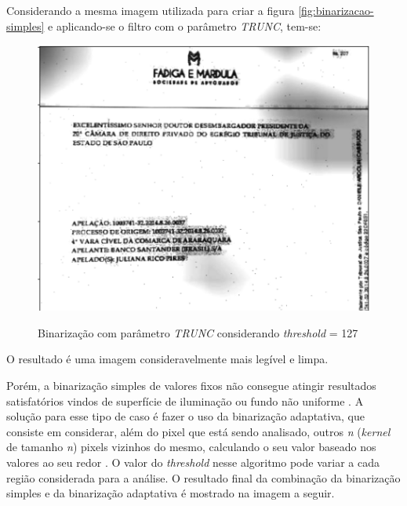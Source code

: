 Considerando a mesma imagem utilizada para criar a figura \ref{fig:binarizacao-simples} e aplicando-se o filtro com o parâmetro \textit{TRUNC}, tem-se:

\begin{figure}[H]
  \centering
  \caption{Binarização com parâmetro \textit{TRUNC} considerando \textit{threshold} = 127}
  \includegraphics[scale=.7]{figuras/binarizacao-simples-trunc.png}
  \label{fig:binarizacao-simples-trunc}
\end{figure}

O resultado é uma imagem consideravelmente mais legível e limpa.

Porém, a binarização simples de valores fixos não consegue atingir resultados satisfatórios vindos de superfície de iluminação ou fundo não uniforme \cite{adaptative-threshold-surfaces}. A solução para esse tipo de caso é fazer o uso da binarização adaptativa, que consiste em considerar, além do pixel que está sendo analisado, outros \textit{n} (\textit{kernel} de tamanho \textit{n}) pixels vizinhos do mesmo, calculando o seu valor baseado nos valores ao seu redor \cite{adaptative-threshold-surfaces}. O valor do \textit{threshold} nesse algoritmo pode variar a cada região considerada para a análise. O resultado final da combinação da binarização simples e da binarização adaptativa é mostrado na imagem a seguir.


